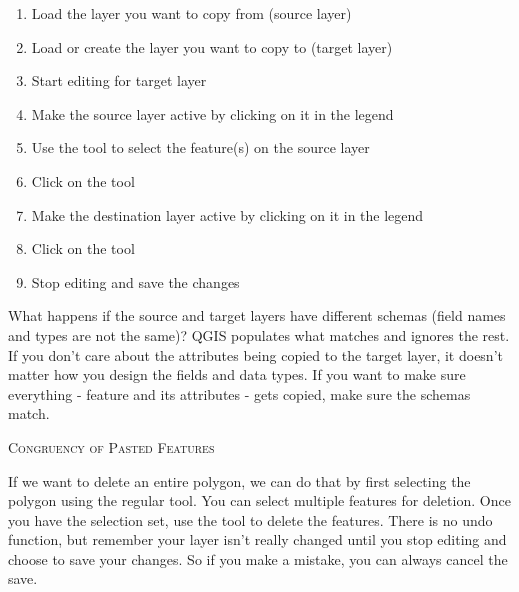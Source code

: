 \begin{enumerate}
\item Load the layer you want to copy from (source layer)
\item Load or create the layer you want to copy to (target layer) 
\item Start editing for target layer
\item Make the source layer active by clicking on it in the legend 
\item Use the  tool to select the feature(s) on the source layer
\item Click on the  tool
\item Make the destination layer active by clicking on it in the legend 
\item Click on the  tool 
\item Stop editing and save the changes
\end{enumerate}

What happens if the source and target layers have
different schemas (field names and types are not the same)? QGIS populates
what matches and ignores the rest. If you don't care about the attributes
being copied to the target layer, it doesn't matter how you design the
fields and data types. If you want to make sure everything - feature and its
attributes - gets copied, make sure the schemas match.

\begin{Tip}[ht]\caption{\textsc{Congruency of Pasted Features}}
\end{Tip}


If we want to delete an entire polygon, we can do that by first selecting 
the polygon using the regular  tool. You can select 
multiple features for deletion. Once you have the selection set, use the 
 tool to delete the features. There is no undo function, 
but remember your layer isn't really changed until you stop editing and choose 
to save your changes. So if you make a mistake, you can always cancel the save.

